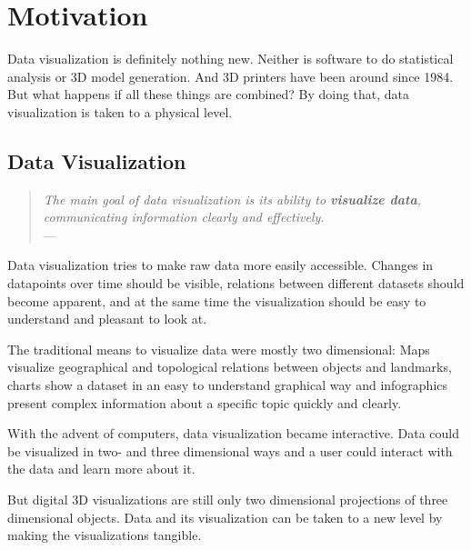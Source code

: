 
\chapter{Motivation}

\label{ch:motivation} %


Data visualization is definitely nothing new. Neither is software to do
statistical analysis or 3D model generation. And 3D printers have been around
since 1984. But what happens if all these things are combined? By doing that,
data visualization is taken to a physical level.


\section{Data Visualization}\label{sec:datavis}

\begin{quote}{\slshape
The main goal of data visualization is its ability to \textbf{visualize data},
communicating information clearly and effectively.} \\ \medskip
---  \citep{friedman:2008}
\end{quote}

Data visualization tries to make raw data more easily accessible. Changes in
datapoints over time should be visible, relations between different datasets
should become apparent, and at the same time the visualization should be easy to
understand and pleasant to look at.

The traditional means to visualize data were mostly two dimensional: Maps
visualize geographical and topological relations between objects and landmarks,
charts show a dataset in an easy to understand graphical way and infographics
present complex information about a specific topic quickly and clearly.

With the advent of computers, data visualization became interactive. Data could
be visualized in two- and three dimensional ways and a user could interact with
the data and learn more about it.

But digital 3D visualizations are still only two dimensional projections of
three dimensional objects. Data and its visualization can be taken to a new
level by making the visualizations tangible.

